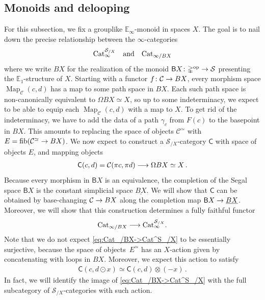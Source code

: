 \documentclass[10pt]{amsart}
\numberwithin{equation}{section}
\theoremstyle{definition}
\DeclareMathOperator{\Map}{Map}
\DeclareMathOperator{\op}{op}
\DeclareMathOperator{\fib}{fib}
\newcommand{\Cat}{\mathrm{Cat}\vphantom{t}}
\newcommand{\bE}{\mathbb{E}}
\newcommand{\Simp}{\mathbb{\Delta}}
\newcommand{\cC}{\mathcal{C}}
\newcommand{\cS}{\mathcal{S}}
\newcommand{\sfB}{\mathsf{B}}
\newcommand{\sfC}{\mathsf{C}}
\renewcommand{\to}{\mathchoice{\longrightarrow}{\rightarrow}{}{}}
\begin{document}
	\subsection{Monoids and delooping}\label{subsec:monoids_and_delooping}
	For this subsection, we fix a grouplike $\bE_{\infty}$-monoid in spaces $X$.
  The goal is to nail down the precise relationship between the $\infty$-categories
  \[\Cat_{\infty}^{\cS_{/X}} \quad \text{and} \quad \Cat_{\infty /BX}
  \]
  where we write $BX$ for the realization of the monoid $\sfB X\colon \Simp^{\op} \to \cS$ presenting the $\bE_{1}$-structure of $X$.
  Starting with a functor $f\colon \cC \to BX$, every morphism space $\Map_{\cC}(c,d)$ has a map to some path space in $BX$.
  Each such path space is non-canonically equivalent to $\Omega BX \simeq X$, so up to some indeterminacy, we expect to be able to equip each $\Map_{\cC}(c,d)$ with a map to $X$.
  To get rid of the indeterminacy, we have to add the data of a path $\gamma_{c}$ from $F(c)$ to the basepoint in $BX$.
  This amounts to replacing the space of objects $\cC^{\simeq}$ with $E=\fib(\cC^{\simeq}\to BX)$.
  We now expect to construct a $\cS_{/X}$-category $\sfC$ with space of objects $E$, and mapping objects
	\begin{align*}
		\sfC(c,d) = \cC(\pi c, \pi d) \to \Omega BX \simeq X \,.
	\end{align*}
    Because every morphism in $\sfB X$ is an equivalence, the completion of the Segal space $\sfB X$ is the constant simplicial space $\underline{BX}$.
    We will show that $\sfC$ can be obtained by base-changing $\cC \to BX$ along the completion map $\sfB X \to \underline{BX}$.
    Moreover, we will show that this construction determines a fully faithful functor
	\begin{align}\label{eq:Cat_/BX->Cat^S_/X}
		\Cat_{\infty / BX} \to \Cat_{\infty}^{\cS_{/X}}.
	\end{align}
	Note that we do not expect \eqref{eq:Cat_/BX->Cat^S_/X} to be essentially surjective, because the space of objects~$E^{\simeq}$ has an $X$-action given by concatenating with loops in $BX$.
  Moreover, we expect this action to satisfy
	\begin{align}\label{eq:EX-action}
		\sfC(c,d\odot x) \simeq \sfC(c,d) \otimes (-x) \,.
	\end{align}
	In fact, we will identify the image of \eqref{eq:Cat_/BX->Cat^S_/X} with the full subcategory of $\cS_{/X}$-categories with such action.
\end{document}
